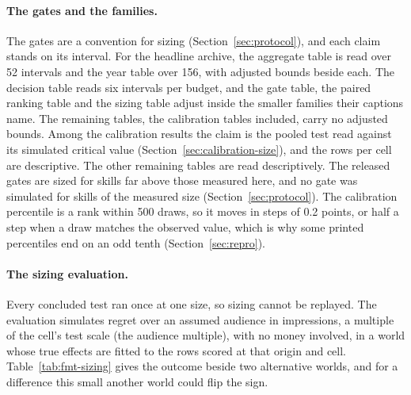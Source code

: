 \label{sec:more-limits}
\paragraph{The gates and the families.}
The gates are a convention for sizing (Section~\ref{sec:protocol}), and each claim stands on its interval. For the headline archive, the aggregate table is read over 52 intervals and the year table over 156, with adjusted bounds beside each. The decision table reads six intervals per budget, and the gate table, the paired ranking table and the sizing table adjust inside the smaller families their captions name. The remaining tables, the calibration tables included, carry no adjusted bounds. Among the calibration results the claim is the pooled test read against its simulated critical value (Section~\ref{sec:calibration-size}), and the rows per cell are descriptive. The other remaining tables are read descriptively.
The released gates are sized for skills far above those measured here, and no gate was simulated for skills of the measured size (Section~\ref{sec:protocol}).
The calibration percentile is a rank within 500 draws, so it moves in steps of 0.2 points, or half a step when a draw matches the observed value, which is why some printed percentiles end on an odd tenth (Section~\ref{sec:repro}).

\paragraph{The sizing evaluation.}
Every concluded test ran once at one size, so sizing cannot be replayed. The evaluation simulates regret over an assumed audience in impressions, a multiple of the cell's test scale (the audience multiple), with no money involved, in a world whose true effects are fitted to the rows scored at that origin and cell. Table~\ref{tab:fmt-sizing} gives the outcome beside two alternative worlds, and for a difference this small another world could flip the sign.

